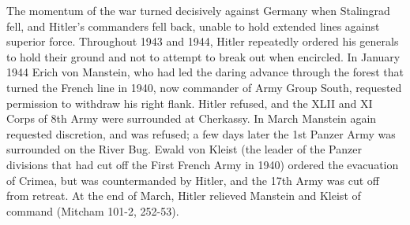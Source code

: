 \documentclass[11pt,]{article}
\begin{document}
The momentum of the war turned decisively against Germany when Stalingrad fell, and Hitler's commanders fell back, unable to hold extended lines against superior force.  Throughout 1943 and 1944, Hitler repeatedly ordered his generals to hold their ground and not to attempt to break out when encircled.  In January 1944 Erich von Manstein, who had led the daring advance through the forest that turned the French line in 1940, now commander of Army Group South, requested permission to withdraw his right flank.  Hitler refused, and the XLII and XI Corps of 8th Army were surrounded at Cherkassy.  In March Manstein again requested discretion, and was refused; a few days later the 1st Panzer Army was surrounded on the River Bug.  Ewald von Kleist (the leader of the Panzer divisions that had cut off the First French Army in 1940) ordered the evacuation of Crimea, but was countermanded by Hitler, and the 17th Army was cut off from retreat. At the end of March, Hitler relieved Manstein and Kleist of command (Mitcham 101-2, 252-53).

\end{document}

